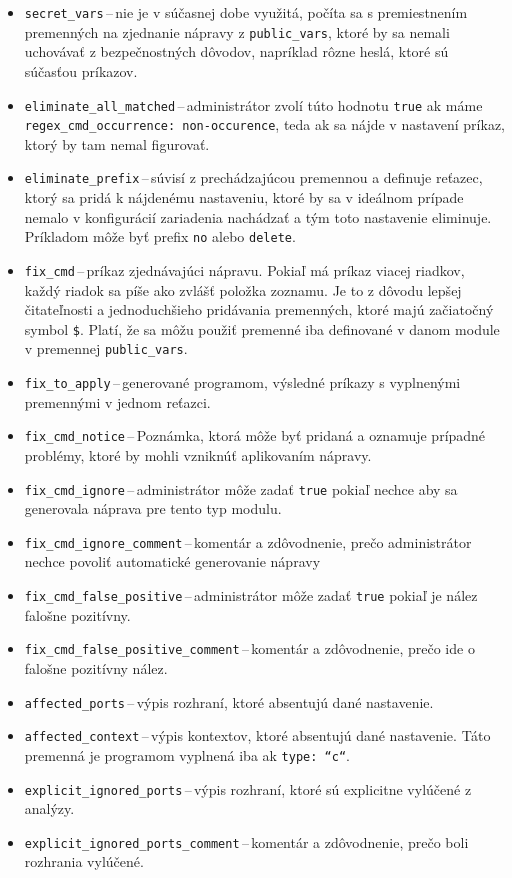\begin{itemize}
	\item \texttt{secret\_vars}\,--\,nie je v súčasnej dobe využitá, počíta sa s premiestnením premenných na zjednanie nápravy z \texttt{public\_vars}, ktoré by sa nemali uchovávať z bezpečnostných dôvodov, napríklad rôzne heslá, ktoré sú súčasťou príkazov.
	\item \texttt{eliminate\_all\_matched}\,--\,administrátor zvolí túto hodnotu \texttt{true} ak máme \texttt{regex\_cmd\_occurrence: non-occurence}, teda ak sa nájde v nastavení príkaz, ktorý by tam nemal figurovať.
	\item \texttt{eliminate\_prefix}\,--\,súvisí z prechádzajúcou premennou a definuje reťazec, ktorý sa pridá k nájdenému nastaveniu, ktoré by sa v ideálnom prípade nemalo v konfigurácií zariadenia nachádzať a tým toto nastavenie eliminuje. Príkladom môže byť prefix \texttt{no} alebo \texttt{delete}.
	\item \texttt{fix\_cmd}\,--\,príkaz zjednávajúci nápravu. Pokiaľ má príkaz viacej riadkov, každý riadok sa píše ako zvlášť položka zoznamu. Je to z dôvodu  lepšej čitateľnosti a jednoduchšieho pridávania premenných, ktoré majú začiatočný symbol \texttt{\$}. Platí, že sa môžu použiť premenné iba definované v danom module v premennej \texttt{public\_vars}.
	\item \texttt{fix\_to\_apply}\,--\,generované programom, výsledné príkazy s vyplnenými premennými v jednom reťazci.
	\item \texttt{fix\_cmd\_notice}\,--\,Poznámka, ktorá môže byť pridaná a oznamuje prípadné problémy, ktoré by mohli vzniknúť aplikovaním nápravy.
	\item \texttt{fix\_cmd\_ignore}\,--\,administrátor môže zadať \texttt{true} pokiaľ nechce aby sa generovala náprava pre tento typ modulu.
	\item \texttt{fix\_cmd\_ignore\_comment}\,--\,komentár a zdôvodnenie, prečo administrátor nechce povoliť automatické generovanie nápravy
	\item \texttt{fix\_cmd\_false\_positive}\,--\,administrátor môže zadať \texttt{true} pokiaľ je nález falošne pozitívny.
	\item \texttt{fix\_cmd\_false\_positive\_comment}\,--\,komentár a zdôvodnenie, prečo ide o falošne pozitívny nález.
	\item \texttt{affected\_ports}\,--\,výpis rozhraní, ktoré absentujú dané nastavenie.
	\item \texttt{affected\_context}\,--\,výpis kontextov, ktoré absentujú dané nastavenie. Táto premenná je programom vyplnená iba ak \texttt{type: ``c``}.
	\item \texttt{explicit\_ignored\_ports}\,--\,výpis rozhraní, ktoré sú explicitne vylúčené z analýzy.
	\item \texttt{explicit\_ignored\_ports\_comment}\,--\,komentár a zdôvodnenie, prečo boli rozhrania vylúčené.
\end{itemize}


